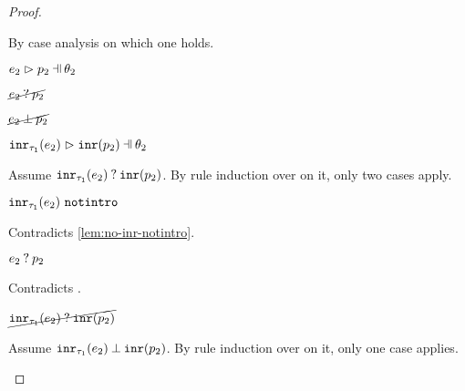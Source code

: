 \begin{proof}
\begin{byCases}
\begin{byCases}
        By case analysis on which one holds.
        \begin{byCases}
        \item[\hpatmatch{e_2}{p_2}{\theta_2}]
            \begin{pfsteps*}
            \item $\hpatmatch{e_2}{p_2}{\theta_2}$  
            \item $\cancel{e_2 \mathbin{?} p_2}$  
            \item $\cancel{e_2 \mathbin{\bot} p_2}$  
            \item $\hpatmatch{\hinr{\tau_1}{e_2}}{\hinrp{p_2}}{\theta_2}$ 
            \end{pfsteps*}
            Assume $\mathtt{inr}_{\tau_1}({e_2}) \mathbin{?} \mathtt{inr}(p_2)$. By rule induction over  on it, only two cases apply.
            \begin{byCases}
            \item[\text{(\ref{rule:MMNotIntro})}]
                \begin{pfsteps*}
                \item $\mathtt{inr}_{\tau_1}({e_2}) ~\mathtt{notintro}$ 
                \end{pfsteps*}
                Contradicts \autoref{lem:no-inr-notintro}.
            \item[\text{(\ref{rule:MMInr})}]
                \begin{pfsteps*}
                \item $e_2 \mathbin{?} p_2$ 
                \end{pfsteps*}
                Contradicts .
            \end{byCases}
            \begin{pfsteps*}
            \item $\cancel{\mathtt{inr}_{\tau_1}({e_2}) \mathbin{?} \mathtt{inr}(p_2)}$ 
            \end{pfsteps*}
            Assume $\mathtt{inr}_{\tau_1}({e_2}) \mathbin{\bot} \mathtt{inr}(p_2)$. By rule induction over  on it, only one case applies.
            \begin{byCases}
            \item[\text{(\ref{rule:NMInr})}]

\end{byCases}
\end{byCases}
\end{byCases}
\end{byCases}
\end{proof}
